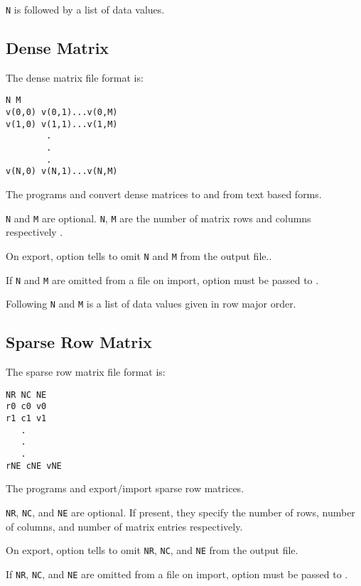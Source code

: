 \verb|N| is followed by a list of data values.

\subsection{Dense Matrix}
\label{sec:dense_matrix}

The dense matrix file format is:

\begin{verbatim}
N M
v(0,0) v(0,1)...v(0,M)
v(1,0) v(1,1)...v(1,M)
        .
        .
        .
v(N,0) v(N,1)...v(N,M)
\end{verbatim}

The programs  and  
convert dense matrices to and from text based forms.

\verb|N| and \verb|M| are optional.  \verb|N|, \verb|M| are the number
of matrix rows and columns respectively .  

On export, option  tells
 to omit \verb|N| and \verb|M| from the
output file..

If \verb|N| and \verb|M| are omitted from a file on import, option
 must be passed to
.

Following \verb|N| and \verb|M| is a list of data values given in row
major order.


\subsection{Sparse Row Matrix}
\label{sparse_row_matrix}

The sparse row matrix file format is:

\begin{verbatim}
NR NC NE
r0 c0 v0
r1 c1 v1
   .
   .
   .
rNE cNE vNE
\end{verbatim}

The programs  and
 export/import sparse row matrices.

\verb|NR|, \verb|NC|, and \verb|NE| are optional.  If present, they
specify the number of rows, number of columns, and number of matrix
entries respectively.

On export, option  tells
 to omit \verb|NR|, \verb|NC|, and
\verb|NE| from the output file.

If \verb|NR|, \verb|NC|, and \verb|NE| are omitted from a file on
import, option  must be passed to .

